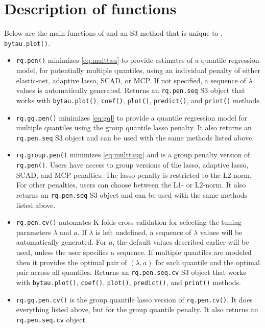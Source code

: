 \section{Description of functions}\label{description-of-functions}

Below are the main functions of  and an S3 method that is unique to , \texttt{bytau.plot()}.

\begin{itemize}
\tightlist
\item
  \texttt{rq.pen()} minimizes \eqref{eq:multtau} to provide estimates of a quantile regression model, for potentially multiple quantiles, using an individual penalty of either elastic-net, adaptive lasso, SCAD, or MCP. If not specified, a sequence of \(\lambda\) values is automatically generated. Returns an \texttt{rq.pen.seq} S3 object that works with \texttt{bytau.plot()}, \texttt{coef()}, \texttt{plot()}, \texttt{predict()}, and \texttt{print()} methods.
\item
  \texttt{rq.gq.pen()} minimizes \eqref{eq:gql} to provide a quantile regression model for multiple quantiles using the group quantile lasso penalty. It also returns an \texttt{rq.pen.seq} S3 object and can be used with the same methods listed above.
\item
  \texttt{rq.group.pen()} minimizes \eqref{eq:multtaug} and is a group penalty version of \texttt{rq.pen()}. Users have access to group versions of the lasso, adaptive lasso, SCAD, and MCP penalties. The lasso penalty is restricted to the L2-norm. For other penalties, users can choose between the L1- or L2-norm. It also returns an \texttt{rq.pen.seq} S3 object and can be used with the same methods listed above.
\item
  \texttt{rq.pen.cv()} automates K-folds cross-validation for selecting the tuning parameters \(\lambda\) and \(a\). If \(\lambda\) is left undefined, a sequence of \(\lambda\) values will be automatically generated. For \(a\), the default values described earlier will be used, unless the user specifies a sequence. If multiple quantiles are modeled then it provides the optimal pair of \((\lambda,a)\) for each quantile and the optimal pair across all quantiles. Returns an \texttt{rq.pen.seq.cv} S3 object that works with \texttt{bytau.plot()}, \texttt{coef()}, \texttt{plot()}, \texttt{predict()}, and \texttt{print()} methods.
\item
  \texttt{rq.gq.pen.cv()} is the group quantile lasso version of \texttt{rq.pen.cv()}. It does everything listed above, but for the group quantile penalty. It also returns an \texttt{rq.pen.seq.cv} object.

\end{itemize}
